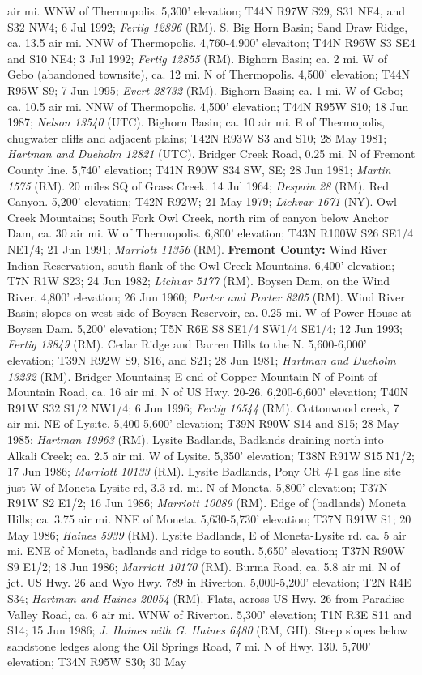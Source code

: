 air mi. WNW of Thermopolis. 5,300' elevation; T44N R97W S29, S31 NE4, and S32 NW4; 6 Jul 1992; \textit{Fertig 12896} (RM).  S. Big Horn Basin; Sand Draw Ridge, ca. 13.5 air mi. NNW of Thermopolis. 4,760-4,900' elevaiton; T44N R96W S3 SE4 and S10 NE4; 3 Jul 1992; \textit{Fertig 12855} (RM).  Bighorn Basin; ca. 2 mi. W of Gebo (abandoned townsite), ca. 12 mi. N of Thermopolis. 4,500' elevation; T44N R95W S9; 7 Jun 1995; \textit{Evert 28732} (RM).  Bighorn Basin; ca. 1 mi. W of Gebo; ca. 10.5 air mi. NNW of Thermopolis.	4,500' elevation; T44N R95W S10; 18 Jun 1987; \textit{Nelson 13540} (UTC).  Bighorn Basin; ca. 10 air mi. E of Thermopolis, chugwater cliffs and adjacent plains; T42N R93W S3 and S10; 28 May 1981; \textit{Hartman and Dueholm 12821} (UTC).  Bridger Creek Road, 0.25 mi. N of Fremont County line. 5,740' elevation; T41N R90W S34 SW, SE; 	28 Jun 1981; \textit{Martin 1575} (RM).  20 miles SQ of Grass Creek. 14 Jul 1964; \textit{Despain 28} (RM).  Red Canyon. 5,200' elevation; T42N R92W; 21 May 1979; \textit{Lichvar 1671} (NY).  Owl Creek Mountains; South Fork Owl Creek, north rim of canyon below Anchor Dam, ca. 30 air mi. W of Thermopolis. 6,800' elevation; T43N R100W S26	SE1/4 NE1/4; 21 Jun 1991; \textit{Marriott 11356} (RM).  \textbf{Fremont County:} Wind River Indian Reservation, south flank of the Owl Creek Mountains. 6,400' elevation; T7N R1W S23; 24 Jun 1982; \textit{Lichvar 5177} (RM).  Boysen Dam, on the Wind River. 4,800' elevation; 26 Jun 1960; \textit{Porter and Porter 8205} (RM).  Wind River Basin; slopes on west side of Boysen Reservoir, ca. 0.25 mi. W of Power House at Boysen Dam. 5,200' elevation; T5N R6E S8	SE1/4 SW1/4 SE1/4; 12 Jun 1993; \textit{Fertig 13849} (RM).  Cedar Ridge and Barren Hills to the N. 5,600-6,000' elevation; T39N R92W S9, S16, and S21; 28 Jun 1981; \textit{Hartman and Dueholm 13232} (RM).  Bridger Mountains; E end of Copper Mountain N of Point of Mountain Road, ca. 16 air mi. N of US Hwy. 20-26. 6,200-6,600' elevation; T40N R91W S32	S1/2 NW1/4; 6 Jun 1996; \textit{Fertig 16544} (RM).  Cottonwood creek, 7 air mi. NE of Lysite. 5,400-5,600' elevation; T39N R90W S14 and S15; 28 May 1985; \textit{Hartman 19963} (RM).  Lysite Badlands, Badlands draining north into Alkali Creek; ca. 2.5 air mi. W of Lysite. 5,350' elevation; T38N R91W S15	N1/2; 17 Jun 1986; \textit{Marriott 10133} (RM).  Lysite Badlands, Pony CR \#1 gas line site just W of Moneta-Lysite rd, 3.3 rd. mi. N of Moneta. 5,800' elevation; T37N R91W S2	E1/2; 16 Jun 1986; \textit{Marriott 10089} (RM).  Edge of (badlands) Moneta Hills; ca. 3.75 air mi. NNE of Moneta. 5,630-5,730' elevation; T37N R91W S1; 20 May 1986; \textit{Haines 5939} (RM).  Lysite Badlands, E of Moneta-Lysite rd. ca. 5 air mi. ENE of Moneta, badlands and ridge to south. 5,650' elevation; T37N R90W S9	E1/2; 18 Jun 1986; \textit{Marriott 10170} (RM).  Burma Road, ca. 5.8 air mi. N of jct. US Hwy. 26 and Wyo Hwy. 789 in Riverton. 5,000-5,200' elevation; T2N R4E S34; \textit{Hartman and Haines 20054} (RM).  Flats, across US Hwy. 26 from Paradise Valley Road, ca. 6 air mi. WNW of Riverton. 5,300' elevation; T1N R3E S11 and S14; 15 Jun 1986; \textit{J. Haines with G. Haines 6480} (RM, GH).  Steep slopes below sandstone ledges along the Oil Springs Road, 7 mi. N of Hwy. 130. 5,700' elevation; T34N R95W S30; 30 May 